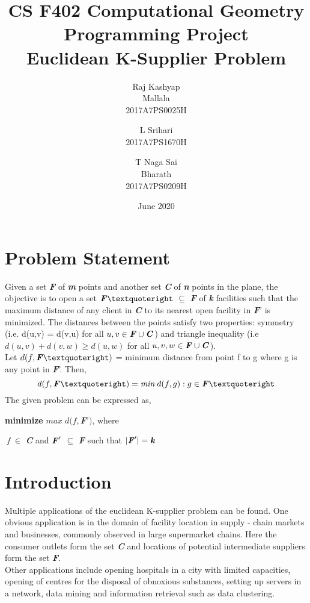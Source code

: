 \documentclass[12pt, a4paper]{article}
\title{%
 \LARGE  CS F402 Computational Geometry
\newline
\newline
\LARGE Programming Project\\
\Large Euclidean K-Supplier Problem
}
\author{%
 \begin{tabular}{c} \small Raj Kashyap\\ \small Mallala\\ \small2017A7PS0025H \end{tabular}\and
 \begin{tabular}{c} \small L Srihari\\ \small2017A7PS1670H \end{tabular}\and
 \begin{tabular}{c}\small T Naga Sai\\ \small Bharath\\ \small2017A7PS0209H \end{tabular}
}
\date{June 2020}
\begin{document}
\maketitle
\section{Problem Statement}
Given a set \textbf{\textit{F}} of \textbf{\textit{m}} points and another set \textbf{\textit{C}} of \textbf{\textit{n}} points in the plane, the objective is to open a set $\textbf{\textit{F}}’$ $\subseteq$ \textbf{\textit{F}} of \textbf{\textit{k}} facilities such that the maximum distance of any client in \textbf{\textit{C}} to its nearest open facility in \textbf{\textit{F}}’ is minimized. The distances between the points satisfy two properties: symmetry (i.e. d(u,v) = d(v,u) for all $u,v \in \textbf{\textit{F}} \cup \textbf{\textit{C}}$) and triangle inequality (i.e $d(u,v)+d(v,w) \geq d(u,w)$ for all $u,v,w  \in \textbf{\textit{F}} \cup \textbf{\textit{C}}$).\\

Let $d(f,\textbf{\textit{F}}’)$ = minimum distance from point f to g where g is any point in  \textbf{\textit{F}}'. Then,
\begin{equation} d(f,\textbf{\textit{F}}’) = \emph{min}\;d(f,g) : g \in \textbf{\textit{F}}’\end{equation}
The given problem can be expressed as,\begin{center}\textbf{minimize} $max\;d(f,$\textbf{\textit{F}}’$)$, where\end{center}
$\;$\textit{f} $\in$  \textbf{\textit{C}} and $\textbf{\textit{F}}'$ $\subseteq$ \textbf{\textit{F}} such that $| \textbf{\textit{F}}' | = \textbf{\textit{k}}$\\

\section{Introduction}
Multiple applications of the euclidean K-supplier problem can be found. One obvious application is in the domain of facility location in supply - chain markets and businesses, commonly observed in large supermarket chains. Here the consumer outlets form the set \textbf{\textit{C}} and locations of potential intermediate suppliers form the set  \textbf{\textit{F}}.\\
Other applications include opening hospitals in a city with limited capacities, opening of centres for the disposal of obnoxious substances, setting up servers in a network, data mining and information retrieval such as data clustering.\\
\end{document}
